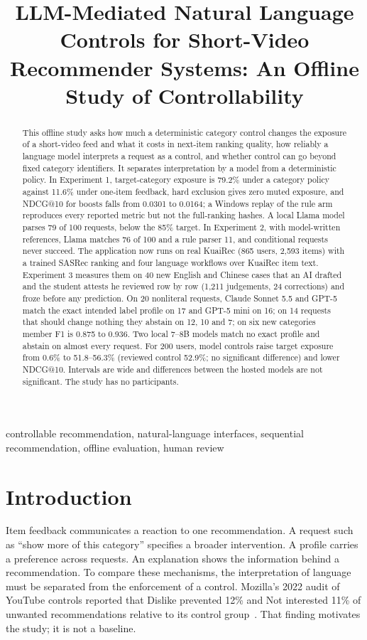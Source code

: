 \documentclass[conference]{IEEEtran}
\title{LLM-Mediated Natural Language Controls for Short-Video Recommender Systems: An Offline Study of Controllability}
\author{\IEEEauthorblockN{Vibhor Malik}\IEEEauthorblockA{M.Sc. in Applied Computing, British Columbia Institute of Technology\\COMP 9500 Research Project. Supervisor: Borna Noureddin. \PaperDate}}
\begin{document}
\maketitle
\thispagestyle{plain}\pagestyle{plain}
\begin{abstract}
This offline study asks how much a deterministic category control changes the exposure of a short-video feed and what it costs in next-item ranking quality, how reliably a language model interprets a request as a control, and whether control can go beyond fixed category identifiers. It separates interpretation by a model from a deterministic policy. In Experiment 1, target-category exposure is 79.2\% under a category policy against 11.6\% under one-item feedback, hard exclusion gives zero muted exposure, and NDCG@10 for boosts falls from 0.0301 to 0.0164; a Windows replay of the rule arm reproduces every reported metric but not the full-ranking hashes. A local Llama model parses 79 of 100 requests, below the 85\% target. In Experiment 2, with model-written references, Llama matches 76 of 100 and a rule parser 11, and conditional requests never succeed. The application now runs on real KuaiRec (865 users, 2,593 items) with a trained SASRec ranking and four language workflows over KuaiRec item text. Experiment 3 measures them on 40 new English and Chinese cases that an AI drafted and the student attests he reviewed row by row (1,211 judgements, 24 corrections) and froze before any prediction. On 20 nonliteral requests, Claude Sonnet 5.5 and GPT-5 match the exact intended label profile on 17 and GPT-5 mini on 16; on 14 requests that should change nothing they abstain on 12, 10 and 7; on six new categories member F1 is 0.875 to 0.936. Two local 7--8B models match no exact profile and abstain on almost every request. For 200 users, model controls raise target exposure from 0.6\% to 51.8--56.3\% (reviewed control 52.9\%; no significant difference) and lower NDCG@10. Intervals are wide and differences between the hosted models are not significant. The study has no participants.
\end{abstract}
\begin{IEEEkeywords}
controllable recommendation, natural-language interfaces, sequential recommendation, offline evaluation, human review
\end{IEEEkeywords}

\section{Introduction}
Item feedback communicates a reaction to one recommendation. A request such as ``show more of this category'' specifies a broader intervention. A profile carries a preference across requests. An explanation shows the information behind a recommendation. To compare these mechanisms, the interpretation of language must be separated from the enforcement of a control. Mozilla's 2022 audit of YouTube controls reported that Dislike prevented 12\% and Not interested 11\% of unwanted recommendations relative to its control group~\cite{ricks2022button}. That finding motivates the study; it is not a baseline.
\end{document}
